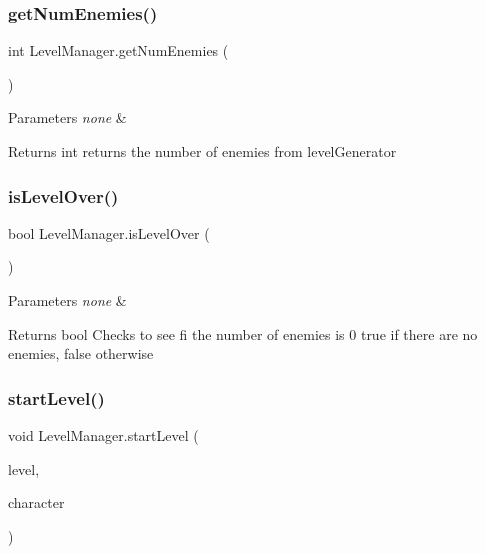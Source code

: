 \subsubsection{\texorpdfstring{get\+Num\+Enemies()}{getNumEnemies()}}
{\footnotesize\ttfamily int Level\+Manager.\+get\+Num\+Enemies (\begin{DoxyParamCaption}{ }\end{DoxyParamCaption})\hspace{0.3cm}{\ttfamily [inline]}}


\begin{DoxyParams}{Parameters}
{\em none} & \\
\hline
\end{DoxyParams}
\begin{DoxyReturn}{Returns}
int returns the number of enemies from level\+Generator 
\end{DoxyReturn}
\mbox{\label{class_level_manager_a28ffd8fcec835f1c04c8013c1173834a}} 
\subsubsection{\texorpdfstring{is\+Level\+Over()}{isLevelOver()}}
{\footnotesize\ttfamily bool Level\+Manager.\+is\+Level\+Over (\begin{DoxyParamCaption}{ }\end{DoxyParamCaption})\hspace{0.3cm}{\ttfamily [inline]}}


\begin{DoxyParams}{Parameters}
{\em none} & \\
\hline
\end{DoxyParams}
\begin{DoxyReturn}{Returns}
bool Checks to see fi the number of enemies is 0 true if there are no enemies, false otherwise 
\end{DoxyReturn}
\mbox{\label{class_level_manager_a3f1b65f6b95299d86c615c9722f5da10}} 
\subsubsection{\texorpdfstring{start\+Level()}{startLevel()}}
{\footnotesize\ttfamily void Level\+Manager.\+start\+Level (\begin{DoxyParamCaption}\item[{int}]{level,  }\item[{Game\+Object}]{character }\end{DoxyParamCaption})\hspace{0.3cm}{\ttfamily [inline]}}


